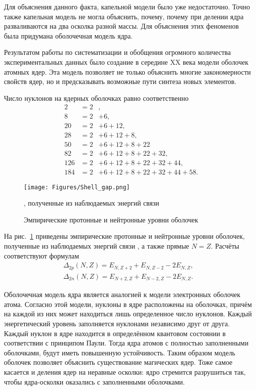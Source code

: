 \documentclass[a5paper,openany]{book}
\begin{document}
	Для объяснения данного факта, капельной модели было уже недостаточно. Точно также капельная модель не могла объяснить, почему, почему при делении ядра разваливаются на два осколка разной массы. Для объяснения этих феноменов была придумана оболочечная модель ядра.
	
	Результатом работы по систематизации и обобщения огромного
	количества экспериментальных данных было создание в середине XX века
	модели оболочек атомных ядер.   
	Эта модель позволяет не только объяснить многие закономерности свойств ядер, но и предсказывать возможные пути синтеза новых элементов.

 Число нуклонов на ядерных оболочках равно соответственно
\begin{align}
& 2 & = 2&,  \\
& 8 & = 2&+6, \\
& 20 & =2&+6+12, \\
& 28 & =2&+6+12+8,\\
& 50 & = 2&+6+12+8+22 \label{Magic50}\\
& 82 & = 2&+6+12+8+22+32, \label{Magic82}\\
& 126 & =2&+6+12+8+22+32+44,\\
& 184 &= 2&+6+12+8+22+32+44+58.
\end{align}

	\begin{figure}[ht] 
	\centering\small
	\unitlength=1mm
	\texttt{[image: Figures/Shell\_gap.png]} 
	\caption{Эмпирические протонные и нейтронные уровни оболочек}, полученные из наблюдаемых энергий связи \cite{AME2016}
	\label{f:Shell_gap}
\end{figure}

На рис.~\ref{f:Shell_gap} приведены эмпирические протонные и нейтронные уровни оболочек, полученные из наблюдаемых энергий связи \cite{AME2016}, а также прямые $N=Z$. Расчёты соответствуют формулам
\begin{align}
\Delta_{2p}(N,Z) = E_{N,Z+2} + E_{N,Z-2} -2E_{N,Z},  \\
\Delta_{2n}(N,Z) = E_{N+2,Z} + E_{N-2,Z} -2E_{N,Z}.
\end{align}	
	
	
	Оболочечная модель ядра является аналогией к модели электронных оболочек атома. Согласно этой модели, нуклоны в ядре расположены на оболочках, причём на каждой из них может находиться лишь определенное число нуклонов. Каждый энергетический уровень заполняется нуклонами независимо друг от друга. Каждый нуклон в ядре находится в определённом  квантовом состоянии в соответствии с принципом Паули.  Тогда ядра атомов с полностью заполненными оболочками, будут иметь повышенную устойчивость. Таким образом модель оболочек позволяет объяснить существование магических ядер.  
	Тоже самое касается и деления ядер на неравные осколки: ядро стремится разрушиться так, чтобы ядра-осколки оказались с заполненными оболочками.
\end{document}

